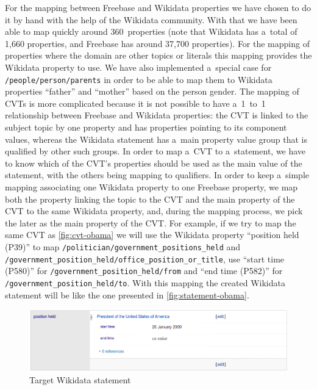 \documentclass{sig-alternate}
\begin{document}
For the mapping between Freebase and Wikidata properties we have chosen to do it by hand
with the help of the Wikidata community.
With that we have been able to map quickly around 360~properties
(note that Wikidata has a~total of 1,660 properties, and Freebase has around 37,700 properties).
For the mapping of properties where the domain are other topics or literals
this mapping provides the Wikidata property to use.
We have also implemented a~special case for \texttt{/people/person/parents}
in order to be able to map them to Wikidata properties ``father'' and ``mother''
based on the person gender.
The mapping of CVTs is more complicated because it is not possible to have a~1~to~1 relationship
between Freebase and Wikidata properties: the CVT is linked to the subject topic by one property
and has properties pointing to its component values, whereas the Wikidata statement
has a~main property value group that is qualified by other such groups.
In order to map a~CVT to a~statement, we have to know which of the CVT's properties
should be used as the main value of the statement, with the others being mapping to qualifiers.
In order to keep a~simple mapping associating one Wikidata property to one Freebase property,
we map both the property linking the topic to the CVT
and the main property of the CVT to the same Wikidata property, and, during the mapping process,
we pick the later as the main property of the CVT.
For example, if we try to map the same CVT as \autoref{fig:cvt-obama}
we will use the Wikidata property ``position held (P39)'' to map
\texttt{/politician/government\_positions\_held} and
\texttt{/government\_position\_held/office\_position\_or\_title}, use ``start time (P580)''
for \texttt{/government\_position\_held/from} and ``end time (P582)'' for
\texttt{/government\_position\_held/to}.
With this mapping the created Wikidata statement will be
like the one presented in \autoref{fig:statement-obama}.

\begin{figure}[!htbp]
\centering
\includegraphics[width=8.45 cm]{img/wikidata-statement-obama.png}
\caption{Target Wikidata statement}
\label{fig:statement-obama}
\end{figure}
\end{document}
